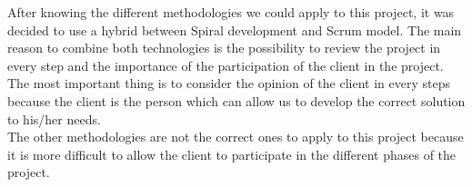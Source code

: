 After knowing the different methodologies we could apply to this project, it was decided to use a hybrid between Spiral development and Scrum model. The main reason to combine both technologies is the possibility to review the project in every step and the importance of the participation of the client in the project. The most important thing is to consider the opinion of the client in every steps because the client is the person which can allow us to develop the correct solution to his/her needs.\\

The other methodologies are not the correct ones to apply to this project because it is more difficult to allow the client to participate in the different phases of the project.

\newpage
\newpage